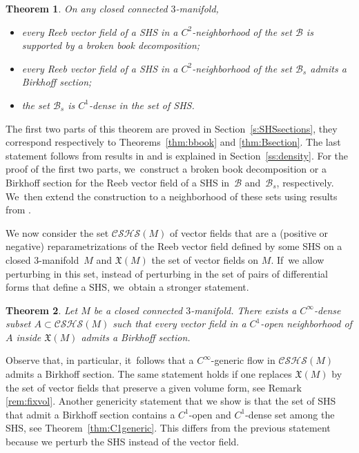 \documentclass[JEP,XML,SOM,Unicode,NoEqCountersInSection,NoFloatCountersInSection,published]{cedram}
\newcommand{\threemanifold}{$3$\nobreakdash-mani\-fold\xspace}
\newtheorem{thm}{Theorem}
\theoremstyle{definition}
\begin{document}
\begin{thm}\label{thm:mainBirk}
On any closed connected \threemanifold,
\begin{itemize}
\item
every Reeb vector field of a SHS in a $C^2$-neighborhood of the set $\mathcal{B}$ is supported by a broken book decomposition;
\item
every Reeb vector field of a SHS in a $C^2$-neighborhood of the set $\mathcal{B}_s$ admits a Birkhoff section;
\item
the set $\mathcal{B}_s$ is $C^1$-dense in the set of SHS.
\end{itemize}
\end{thm}

The first two parts of this theorem are proved in Section~\ref{s:SHSsections}, they correspond respectively to Theorems~\ref{thm:bbook} and \ref{thm:Bsection}.
The last statement follows from results in \cite{CV1} and is explained in Section~\ref{ss:density}. For the proof of the first two parts, we~construct a broken book decomposition or a Birkhoff section for the Reeb vector field of a SHS in~$\mathcal{B}$ and~$\mathcal{B}_s$, respectively. We~then extend the construction to a neighborhood of these sets using results from \cite{CV2}.

We now consider the set $\mathcal{CSHS}(M)$ of vector fields that are a (positive or negative) reparametrizations of the Reeb vector field defined by some SHS on a closed \threemanifold~$M$ and $\mathfrak{X}(M)$ the set of vector fields on $M$. If~we allow perturbing in this set, instead of perturbing in the set of pairs of differential forms that define a SHS, we~obtain a stronger statement.

\begin{thm}\label{thm:generic}
Let $M$ be a closed connected \threemanifold. There exists a $C^\infty$-dense subset $A\subset \mathcal{CSHS}(M)$ such that every vector field in a $C^1$-open neighborhood of $A$ inside $\mathfrak{X}(M)$ admits a Birkhoff section.
\end{thm}

Observe that, in particular, it~follows that a $C^\infty$-generic flow in $\mathcal{CSHS}(M)$ admits a Birkhoff section. The same statement holds if one replaces $\mathfrak{X}(M)$ by the set of vector fields that preserve a given volume form, see Remark \ref{rem:fixvol}. Another genericity statement that we show is that the set of SHS that admit a Birkhoff section contains a $C^1$-open and $C^1$-dense set among the SHS, see Theorem~\ref{thm:C1generic}. This differs from the previous statement because we perturb the SHS instead of the vector field.
\end{document}
